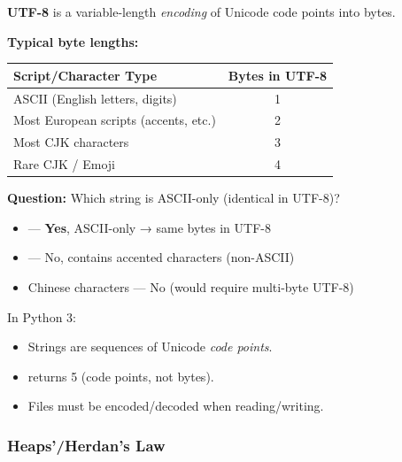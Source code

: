 \begin{defbox}
\textbf{UTF-8} is a variable-length \textit{encoding} of Unicode code points into bytes.

\textbf{Typical byte lengths:}
\begin{center}
\renewcommand{\arraystretch}{1.2}
\begin{tabular}{@{} l c @{}}
\toprule
\textbf{Script/Character Type} & \textbf{Bytes in UTF-8} \\
\midrule
ASCII (English letters, digits) & 1 \\
Most European scripts (accents, etc.) & 2 \\
Most CJK characters & 3 \\
Rare CJK / Emoji & 4 \\
\bottomrule
\end{tabular}
\end{center}
\end{defbox}

\begin{exbox}
\textbf{Question:} Which string is ASCII-only (identical in UTF-8)?

\begin{itemize}
  \item {} --- \textbf{Yes}, ASCII-only → same bytes in UTF-8
  \item {} --- No, contains accented characters (non-ASCII)
  \item Chinese characters --- No (would require multi-byte UTF-8)
\end{itemize}
\end{exbox}

\begin{tipbox}
In Python 3:
\begin{itemize}
  \item Strings are sequences of Unicode \textit{code points}.
  \item {} returns 5 (code points, not bytes).
  \item Files must be encoded/decoded when reading/writing.
\end{itemize}
\end{tipbox}

\bigseparator

\subsubsection{Heaps'/Herdan's Law}

